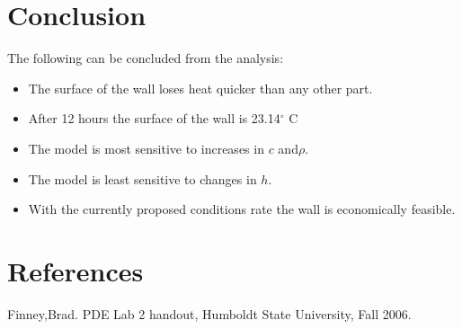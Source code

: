 \documentclass[titlepage,11pt]{article}
\begin{document}
\newpage
\section{Conclusion}
The following can be concluded from the analysis:
\begin{itemize}
\item{The surface of the wall loses heat quicker than any other part.}
\item{After 12 hours the surface of the wall is 23.14$^\circ$ C}
\item{The model is most sensitive to increases in $c$ and$\rho$.}
\item{The model is least sensitive to changes in $h$.}
\item{With the currently proposed conditions rate the wall is economically feasible.}
\end{itemize}

\section{References}
\noindent Finney,Brad. PDE Lab 2 handout, Humboldt State University,
Fall 2006.
\end{document}
